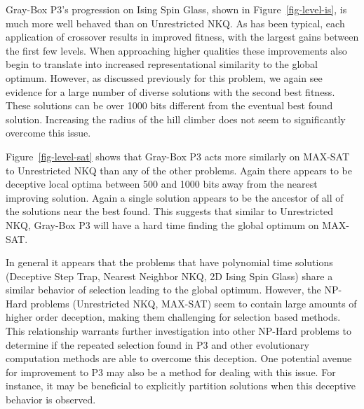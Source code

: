 Gray-Box P3's progression on Ising Spin Glass, shown in Figure~\ref{fig-level-is}, is much more well behaved than on Unrestricted
NKQ. As has been typical, each application of crossover results in improved fitness, with the largest gains between the first few levels.
When approaching higher qualities these improvements also begin to translate into increased representational similarity to the global optimum.
However, as discussed previously for this problem, we again see evidence for a large number of diverse solutions with the second best
fitness. These solutions can be over 1000 bits different from the eventual best found solution. Increasing the radius of the hill climber
does not seem to significantly overcome this issue.

\begin{figure*}
  \centering
  \caption{Distribution of local optima stored at each level of Gray-Box P3 in relation to the best found by the run on
           a MAX-SAT problem $N=6000$.}
  \label{fig-level-sat}
\end{figure*}

Figure~\ref{fig-level-sat} shows that Gray-Box P3 acts more similarly on MAX-SAT to Unrestricted NKQ than any of the other problems. Again there
appears to be deceptive local optima between 500 and 1000 bits away from the nearest improving solution. Again a single solution appears
to be the ancestor of all of the solutions near the best found. This suggests that similar to Unrestricted NKQ, Gray-Box P3 will have a
hard time finding the global optimum on MAX-SAT.

In general it appears that the problems that have polynomial time solutions (Deceptive Step Trap, Nearest Neighbor NKQ, 2D Ising Spin Glass)
share a similar behavior of selection leading to the global optimum. However, the NP-Hard problems (Unrestricted NKQ, MAX-SAT) seem to contain
large amounts of higher order deception, making them challenging for selection based methods. This relationship warrants further investigation
into other NP-Hard problems to determine if the repeated selection found in P3 and other evolutionary computation methods are able to overcome
this deception. One potential avenue for improvement to P3 may also be a method for dealing with this issue. For instance, it may be beneficial to
explicitly partition solutions when this deceptive behavior is observed.

